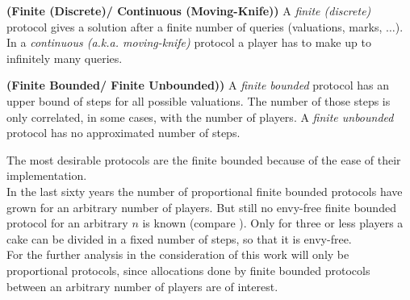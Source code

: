 \begin{defi}{\textbf{(Finite (Discrete)/ Continuous (Moving-Knife))}}
\newline A \emph{finite (discrete)} protocol gives a solution after a finite number of queries (valuations, marks, $\ldots$). In a \emph{continuous (a.k.a. moving-knife)} protocol a player has to make up to infinitely many queries.
\end{defi}
\begin{defi}{\textbf{(Finite Bounded/ Finite Unbounded))}}
\newline A \emph{finite bounded} protocol has an upper bound of steps for all possible valuations. The number of those steps is only correlated, in some cases, with the number of players. A \emph{finite unbounded} protocol has no approximated number of steps.
\end{defi}
The most desirable protocols are the finite bounded because of the ease of their implementation. \\
In the last sixty years the number of proportional finite bounded protocols have grown for an arbitrary number of players. But still no envy-free finite bounded protocol for an arbitrary $n$ is known (compare \cite{chen:truth}). Only for three or less players a cake can be divided in a fixed number of steps, so that it is envy-free. \\For the further analysis in the consideration of this work will only be proportional protocols, since allocations done by finite bounded protocols between an arbitrary number of players are of interest.
